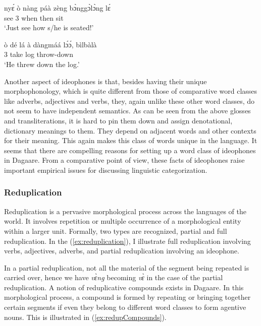     \ex
    \gll nyɛ́ ò nàng páà zèng bɔ̀nggɔ̀lɔ̀ng lɛ́\\
    see 3{\SG} when then sit {\IDPH} {\PART}\\
    \glt ‘Just see how s/he is seated!’

    \ex
    \gll ò dé lá à dàngmáá lɔ́ɔ́, bìlbàlà\\
    3{\SG} take {\FOC} {\DEF} log throw-down {\IDPH}\\
    \glt ‘He threw down the log.’
    \z
\z

Another aspect of ideophones is that, besides having their unique morphophonology, which is
quite different from those of comparative word classes like adverbs, adjectives and verbs, they, again unlike these other word classes, do not seem to have independent semantics.
As can be seen from the above glosses and transliterations, it is hard to pin them down and
assign denotational, dictionary meanings to them. They depend on adjacent words and other
contexts for their meaning. This again makes this class of words unique in the language. It
seems that there are compelling reasons for setting up a word class of ideophones in
Dagaare. From a comparative point of view, these facts of ideophones raise important
empirical issues for discussing linguistic categorization.


\subsubsection{Reduplication}
Reduplication is a pervasive morphological process across the languages of the world. It
involves repetition or multiple occurrence of a morphological entity within a larger unit.
Formally, two types are recognized, partial and full reduplication. In the (\ref{ex:reduplication}), I illustrate full reduplication involving verbs, adjectives, adverbs, and partial
reduplication involving an ideophone.


In a partial reduplication, not all the material of the segment being repeated is carried over,
hence we have \textit{vɛ̀ng} becoming \textit{vɛ̀} in the case of the partial reduplication.
A notion of reduplicative compounds exists in Dagaare. In this morphological process, a
compound is formed by repeating or bringing together certain segments if even they belong to
different word classes to form agentive nouns. This is illustrated in (\ref{ex:redupCompounds}).


